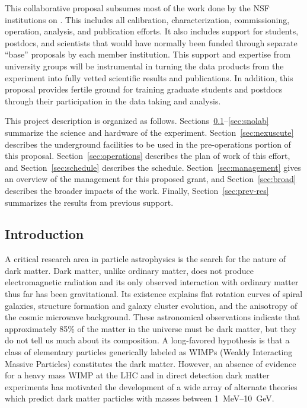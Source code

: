 This collaborative proposal subsumes most of the work done by the NSF institutions on \scs. This includes all calibration, characterization, commissioning, operation, analysis, and publication efforts. It also includes support for students, postdocs, and scientists that would have normally been funded through separate ``base'' proposals by each member institution. This support and expertise from university groups will be instrumental in turning the data products from the \scs experiment into fully vetted scientific results and publications. In addition, this proposal provides fertile ground for training graduate students and postdocs through their participation in the data taking and analysis. 

 This project description is organized as follows. 
Sections~\ref{sec:introduction}--\ref{sec:snolab} summarize the science and hardware of the \scs experiment. 
Section~\ref{sec:nexuscute} describes the underground facilities to be used in the pre-operations portion of this proposal.
Section~\ref{sec:operations} describes the plan of work of this effort, and Section~\ref{sec:schedule} describes the schedule.
Section~\ref{sec:management} gives an overview of the management for this proposed grant, and Section~\ref{sec:broad} describes the broader impacts of the work.
Finally, Section~\ref{sec:prev-res} summarizes the results from previous support.


\subsection{Introduction}
\label{sec:introduction}

A critical research area in particle astrophysics is the search for the nature of dark matter. Dark matter, unlike ordinary matter, does not produce electromagnetic radiation and its only observed interaction with ordinary matter thus far has been gravitational. Its existence explains flat rotation curves of spiral galaxies, structure formation and galaxy cluster evolution, and the anisotropy of the cosmic microwave background. These astronomical observations indicate that approximately 85\% of the matter in the universe must be dark matter, but they do not tell us much about its composition. A long-favored hypothesis is that a class of elementary particles generically labeled as WIMPs (Weakly Interacting Massive Particles) constitutes the dark matter. However, an absence of evidence for a heavy mass WIMP at the LHC and in direct detection dark matter experiments has motivated the development of a wide array of alternate theories which predict dark matter particles with masses between 1~MeV--10~GeV. 

